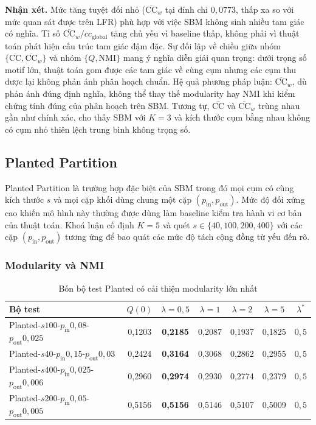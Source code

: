 \textbf{Nhận xét.} Mức tăng tuyệt đối nhỏ ($\overline{\mathrm{CC}}_w$ tại đỉnh chỉ $0{,}0773$, thấp xa so với mức quan sát được trên LFR) phù hợp với việc SBM không sinh nhiều tam giác có nghĩa. Tỉ số $\overline{\mathrm{CC}}_w / cc_{\mathrm{global}}$ tăng chủ yếu vì baseline thấp, không phải vì thuật toán phát hiện cấu trúc tam giác đậm đặc. Sự đối lập về chiều giữa nhóm $\{\overline{\mathrm{CC}}, \overline{\mathrm{CC}}_w\}$ và nhóm $\{Q, \mathrm{NMI}\}$ mang ý nghĩa diễn giải quan trọng: dưới trọng số motif lớn, thuật toán gom được các tam giác về cùng cụm nhưng các cụm thu được lại không phản ánh phân hoạch chuẩn. Hệ quả phương pháp luận: $\overline{\mathrm{CC}}_w$, dù phản ánh đúng định nghĩa, không thể thay thế modularity hay NMI khi kiểm chứng tính đúng của phân hoạch trên SBM. Tương tự, $\overline{\mathrm{CC}}$ và $\overline{\mathrm{CC}}_w$ trùng nhau gần như chính xác, cho thấy SBM với $K = 3$ và kích thước cụm bằng nhau không có cụm nhỏ thiên lệch trung bình không trọng số.

\subsection{Planted Partition}
\label{subsec:results-planted}

Planted Partition là trường hợp đặc biệt của SBM trong đó mọi cụm có cùng kích thước $s$ và mọi cặp khối dùng chung một cặp $(p_{\mathrm{in}}, p_{\mathrm{out}})$. Mức độ đối xứng cao khiến mô hình này thường được dùng làm baseline kiểm tra hành vi cơ bản của thuật toán. Khoá luận cố định $K = 5$ và quét $s \in \{40, 100, 200, 400\}$ với các cặp $(p_{\mathrm{in}}, p_{\mathrm{out}})$ tương ứng để bao quát các mức độ tách cộng đồng từ yếu đến rõ.

\subsubsection*{Modularity và NMI}

\begin{table}[H]
\centering
\caption{Bốn bộ test Planted có cải thiện modularity lớn nhất}
\label{tab:planted-top5}
\begin{tabular}{|l|c|c|c|c|c|c|}
\hline
\textbf{Bộ test} & $Q(0)$ & $\lambda{=}0{,}5$ & $\lambda{=}1$ & $\lambda{=}2$ & $\lambda{=}5$ & $\lambda^*$ \\ \hline
Planted-$s100$-$p_{\mathrm{in}}0{,}08$-$p_{\mathrm{out}}0{,}025$  & 0{,}1203 & \textbf{0{,}2185} & 0{,}2087 & 0{,}1937 & 0{,}1825 & $0{,}5$ \\ \hline
Planted-$s40$-$p_{\mathrm{in}}0{,}15$-$p_{\mathrm{out}}0{,}03$   & 0{,}2424 & \textbf{0{,}3164} & 0{,}3068 & 0{,}2862 & 0{,}2955 & $0{,}5$ \\ \hline
Planted-$s400$-$p_{\mathrm{in}}0{,}025$-$p_{\mathrm{out}}0{,}006$ & 0{,}2960 & \textbf{0{,}2974} & 0{,}2930 & 0{,}2774 & 0{,}2379 & $0{,}5$ \\ \hline
Planted-$s200$-$p_{\mathrm{in}}0{,}05$-$p_{\mathrm{out}}0{,}005$  & 0{,}5156 & \textbf{0{,}5156} & 0{,}5146 & 0{,}5107 & 0{,}5009 & $0{,}5$ \\ \hline
\end{tabular}
\end{table}


